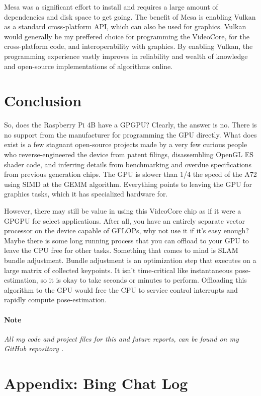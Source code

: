 \documentclass[12pt]{article}
\begin{document}
Mesa was a significant effort to install and requires a large amount of dependencies and disk space to get going. The benefit of Mesa is enabling Vulkan as a standard cross-platform API, which can also be used for graphics. Vulkan would generally be my preffered choice for programming the VideoCore, for the cross-platform code, and interoperability with graphics. By enabling Vulkan, the programming experience vastly improves in reliability and wealth of knowledge and open-source implementations of algorithms online.

\section{Conclusion}\label{sec:conclusion}
So, does the Raspberry Pi 4B have a GPGPU? Clearly, the answer is no. There is no support from the manufacturer for programming the GPU directly. What does exist is a few stagnant open-source projects made by a very few curious people who reverse-engineered the device from patent filings, disassembling OpenGL ES shader code, and inferring details from benchmarking and overdue specifications from previous generation chips. The GPU is slower than 1/4 the speed of the A72 using SIMD at the GEMM algorithm. Everything points to leaving the GPU for graphics tasks, which it has specialized hardware for.

However, there may still be value in using this VideoCore chip as if it were a GPGPU for select applications. After all, you have an entirely separate vector processor on the device capable of GFLOPs, why not use it if it's easy enough? Maybe there is some long running process that you can offload to your GPU to leave the CPU free for other tasks. Something that comes to mind is SLAM bundle adjustment. Bundle adjustment is an optimization step that executes on a large matrix of collected keypoints. It isn't time-critical like instantaneous pose-estimation, so it is okay to take seconds or minutes to perform. Offloading this algorithm to the GPU would free the CPU to service control interrupts and rapidly compute pose-estimation. 

\paragraph{Note}
\textit{All my code and project files for this and future reports, can be found on my GitHub repository \cite{lybbert2024classwork}.}




\section{Appendix: Bing Chat Log}

\end{document}
